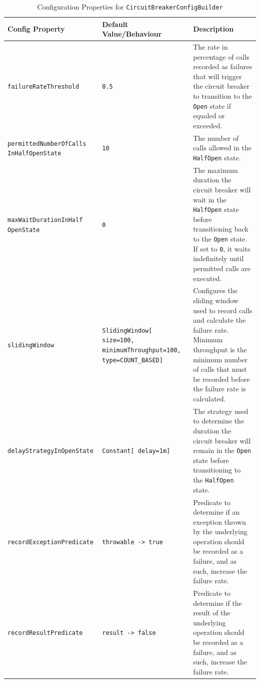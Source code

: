 \begin{table}[!htb]
    \centering
    \caption{Configuration Properties for \texttt{CircuitBreakerConfigBuilder}}
    \label{tab:cbreaker-config-builder}
    \vspace{0.3cm}
    \begin{tabular}{|p{5cm}|p{5cm}|p{6cm}|}
        \hline
        \textbf{Config Property}          & \textbf{Default Value/Behaviour} & \textbf{Description}                                                                                                                                        \\ \hline
        \texttt{failureRateThreshold}     & \texttt{0.5}                     & The rate in percentage of calls recorded as failures that will trigger the circuit breaker to transition to the \texttt{Open} state if equaled or exceeded. \\ \hline
        \texttt{permittedNumberOfCalls InHalfOpenState} & \texttt{10} & The number of calls
        allowed in the \texttt{HalfOpen} state. \\ \hline
        \texttt{maxWaitDurationInHalf OpenState} & \texttt{0} & The maximum duration
        the circuit breaker will wait in the \texttt{HalfOpen} state before transitioning back to the \texttt{Open} state.
        If set to \texttt{0}, it waits indefinitely until permitted calls are executed. \\ \hline
        \texttt{slidingWindow} & \texttt{SlidingWindow[ size=100, minimumThroughput=100, type=COUNT\_BASED]}
        & Configures the sliding window used to record calls and calculate the failure rate.
        Minimum throughput is the minimum number of calls
        that must be recorded before the failure rate is calculated.
        \\ \hline
        \texttt{delayStrategyInOpenState} & \texttt{Constant[ delay=1m]}     & The strategy used to determine the duration the circuit breaker will remain in the \texttt{Open} state before transitioning to the \texttt{HalfOpen} state. \\ \hline
        \texttt{recordExceptionPredicate} & \texttt{throwable ->
            true} & Predicate
        to determine if an exception thrown by the underlying operation should be recorded as a failure, and as such, increase the failure rate. \\ \hline
        \texttt{recordResultPredicate} & \texttt{result ->
            false} & Predicate
        to determine if the result of the underlying operation should be recorded as a failure, and as such, increase the failure rate. \\ \hline
    \end{tabular}
\end{table}


